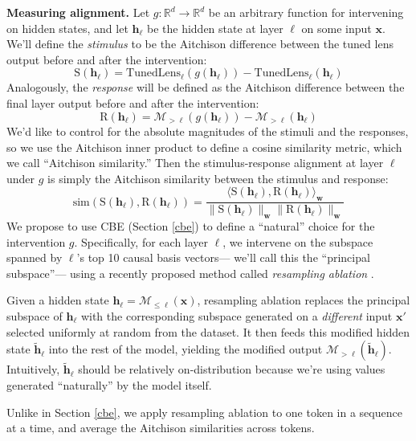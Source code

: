 \documentclass{article}
\theoremstyle{plain}
\theoremstyle{definition}
\newcommand{\R}{\mathbb{R}}      %
\newcommand{\innerproduct}[2]{\langle #1, #2 \rangle}
\newcommand{\hh}{\boldsymbol h} %
\newcommand{\xx}{\boldsymbol x} %
\begin{document}
\textbf{Measuring alignment.} Let $g : \R^d \rightarrow \R^d $ be an arbitrary function for intervening on hidden states, and let $\hh_{\ell}$ be the hidden state at layer $\ell$ on some input $\xx$. We'll define the \emph{stimulus} to be the Aitchison difference between the tuned lens output before and after the intervention:
\begin{equation}
    \mathrm{S}(\hh_{\ell}) = \mathrm{TunedLens}_{\ell}(g(\hh_{\ell})) -  \mathrm{TunedLens}_{\ell}(\hh_{\ell})
\end{equation}
Analogously, the \emph{response} will be defined as the Aitchison difference between the final layer output before and after the intervention:
\begin{equation}
    \mathrm{R}(\hh_{\ell}) = \mathcal{M}_{>\ell}(g(\hh_{\ell})) - \mathcal{M}_{>\ell}(\hh_{\ell})
\end{equation}
We'd like to control for the absolute magnitudes of the stimuli and the responses, so we use the Aitchison inner product to define a cosine similarity metric, which we call ``Aitchison similarity.'' Then the stimulus-response alignment at layer $\ell$ under $g$ is simply the Aitchison similarity between the stimulus and response:
\begin{equation}
    \mathrm{sim}(\mathrm{S}(\hh_{\ell}), \mathrm{R}(\hh_{\ell})) = \frac{\innerproduct{\mathrm{S}(\hh_{\ell})}{\mathrm{R}(\hh_{\ell})}_{\mathbf{w}} }{\|\mathrm{S}(\hh_{\ell})\|_{\mathbf{w}} \|\mathrm{R}(\hh_{\ell})\|_{\mathbf{w}}}
\end{equation}
We propose to use CBE (Section \ref{cbe}) to define a ``natural'' choice for the intervention $g$. Specifically, for each layer $\ell$, we intervene on the subspace spanned by $\ell$'s top 10 causal basis vectors--- we'll call this the ``principal subspace''--- using a recently proposed method called \emph{resampling ablation} \cite{chan2022causal}.

Given a hidden state $\hh_{\ell} = \mathcal{M}_{\leq\ell}(\xx)$, resampling ablation replaces the principal subspace of $\hh_{\ell}$ with the corresponding subspace generated on a \emph{different} input $\xx'$ selected uniformly at random from the dataset. It then feeds this modified hidden state $\tilde{\hh}_{\ell}$ into the rest of the model, yielding the modified output $\mathcal{M}_{>\ell}(\tilde{\hh}_{\ell})$. Intuitively, $\tilde{\hh}_{\ell}$ should be relatively on-distribution because we're using values generated ``naturally'' by the model itself.

Unlike in Section \ref{cbe}, we apply resampling ablation to one token in a sequence at a time, and average the Aitchison similarities across tokens. 
\end{document}
